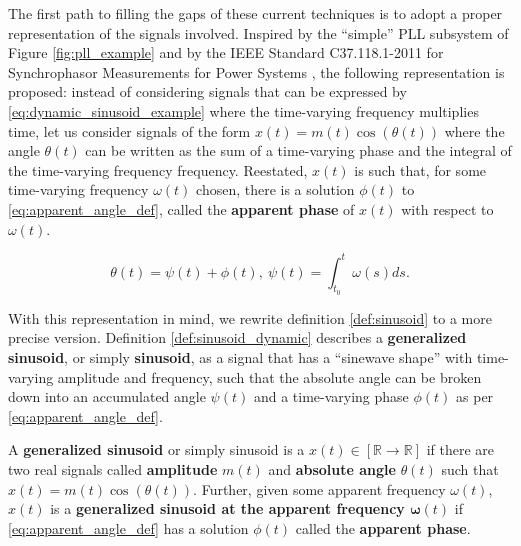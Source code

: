 	The first path to filling the gaps of these current techniques is to adopt a proper representation of the signals involved. Inspired by the ``simple'' PLL subsystem of Figure \ref{fig:pll_example} and by the IEEE Standard C37.118.1-2011 for Synchrophasor Measurements for Power Systems , the following representation is proposed: instead of considering signals that can be expressed by \eqref{eq:dynamic_sinusoid_example} where the time-varying frequency multiplies time, let us consider signals of the form $x(t) = m(t)\cos\left(\theta(t)\right)$ where the angle $\theta(t)$ can be written as the sum of a time-varying phase and the integral of the time-varying frequency frequency. Reestated, $x(t)$ is such that, for some time-varying frequency $\omega(t)$ chosen, there is a solution $\phi(t)$ to \eqref{eq:apparent_angle_def}, called the \textbf{apparent phase} of $x(t)$ with respect to $\omega(t)$.

\begin{equation} \theta(t) = \psi(t) + \phi(t),\ \psi(t) = \int_{t_0}^t \omega(s)ds . \label{eq:apparent_angle_def}\end{equation}

	With this representation in mind, we rewrite definition \ref{def:sinusoid} to a more precise version. Definition \ref{def:sinusoid_dynamic} describes a \textbf{generalized sinusoid}, or simply \textbf{sinusoid}, as a signal that has a ``sinewave shape'' with time-varying amplitude and frequency, such that the absolute angle can be broken down into an accumulated angle $\psi(t)$ and a time-varying phase $\phi(t)$ as per \eqref{eq:apparent_angle_def}.

\begin{definition}\label{def:sinusoid_dynamic}%
	A \textbf{generalized sinusoid} or simply sinusoid is a $x(t)\in\left[\mathbb{R}\to\mathbb{R}\right]$ if there are two real signals called \textbf{amplitude} $m(t)$ and \textbf{absolute angle} $\theta(t)$ such that $x(t) = m(t)\cos\left(\theta(t)\right)$. Further, given some apparent frequency $\omega(t)$, $x(t)$ is a \textbf{generalized sinusoid at the apparent frequency $\boldsymbol{\omega}(t)$} if \eqref{eq:apparent_angle_def} has a solution $\phi(t)$ called the \textbf{apparent phase}.
\end{definition} %

